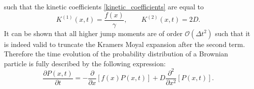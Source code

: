 such that the kinetic coefficients \eqref{kinetic_coefficients} are equal to
\begin{equation}
    K^{(1)}(x,t) = \frac{f(x)}{\gamma}, \qquad K^{(2)}(x,t) = 2 D.
    \label{BD_kinetic_coefficients}
\end{equation}
It can be shown that all higher jump moments are of order $\mathcal{O}(\Delta t ^{2})$ such that it is indeed valid to truncate the Kramers Moyal expansion after the second term. Therefore the time evolution of the probability distribution of a Brownian particle is fully described by the following expression:
\begin{equation}
    \frac{\partial P(x,t)}{\partial t} = - \frac{\partial}{\partial x} \left[f(x)P(x,t) \right] + D\frac{\partial^2}{\partial x^2}\left[P(x,t) \right] .
    \label{FPE2}
\end{equation}

